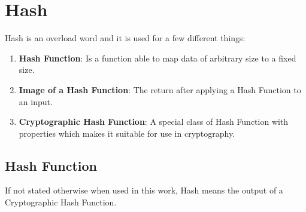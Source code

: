 \section{Hash}
Hash is an overload word and it is used for a few different things:
\begin{enumerate}
	\item \textbf{Hash Function}: Is a function able to map data of arbitrary size
		to a fixed size.
	\item \textbf{Image of a Hash Function}: The return after applying a Hash
		Function to an input.
	\item \textbf{Cryptographic Hash Function}: A special class of Hash Function
		with properties which makes it suitable for use in cryptography.
\end{enumerate}
\subsection{Hash Function}
If not stated otherwise when used in this work, Hash means the output of a
  Cryptographic Hash Function.
